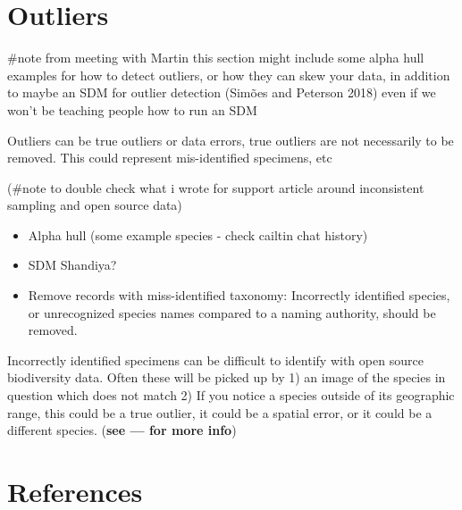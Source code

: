 \documentclass[
  letterpaper,
  DIV=11,
  numbers=noendperiod,
  oneside]{scrreprt}
\begin{document}

\hypertarget{outliers}{%
\chapter{Outliers}\label{outliers}}

\#note from meeting with Martin this section might include some alpha
hull examples for how to detect outliers, or how they can skew your
data, in addition to maybe an SDM for outlier detection (Simões and
Peterson 2018) even if we won't be teaching people how to run an SDM

Outliers can be true outliers or data errors, true outliers are not
necessarily to be removed. This could represent mis-identified
specimens, etc

(\#note to double check what i wrote for support article around
inconsistent sampling and open source data)

\begin{itemize}
\item
  Alpha hull (some example species - check cailtin chat history)
\item
  SDM Shandiya?
\item
  Remove records with miss-identified taxonomy: Incorrectly identified
  species, or unrecognized species names compared to a naming authority,
  should be removed.
\end{itemize}

Incorrectly identified specimens can be difficult to identify with open
source biodiversity data. Often these will be picked up by 1) an image
of the species in question which does not match 2) If you notice a
species outside of its geographic range, this could be a true outlier,
it could be a spatial error, or it could be a different species.
(\textbf{see --- for more info})


\hypertarget{sec-references}{%
\chapter{References}\label{sec-references}}
\end{document}
